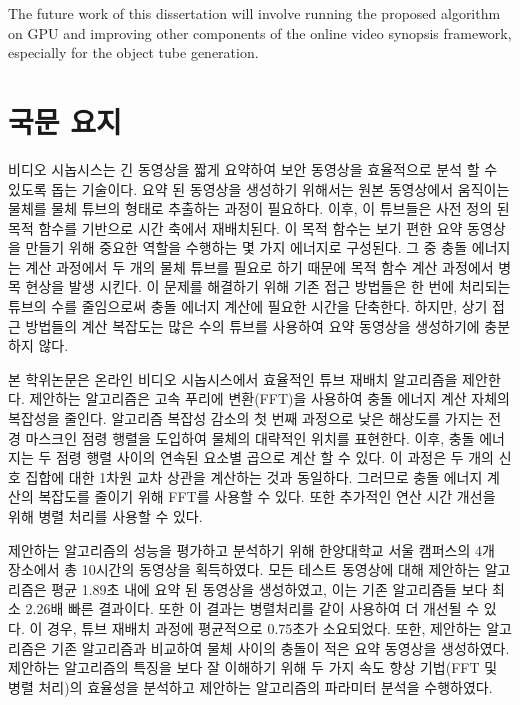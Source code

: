 \documentclass[11pt]{hyu_thesis}
\begin{document}
The future work of this dissertation will involve running the proposed algorithm on GPU and improving other components of the online video synopsis framework, especially for the object tube generation.




\chapter*{국문 요지}

비디오 시놉시스는 긴 동영상을 짧게 요약하여 보안 동영상을 효율적으로 분석 할 수 있도록 돕는 기술이다. 요약 된 동영상을 생성하기 위해서는 원본 동영상에서 움직이는 물체를 물체 튜브의 형태로 추출하는 과정이 필요하다. 이후, 이 튜브들은 사전 정의 된 목적 함수를 기반으로 시간 축에서 재배치된다. 이 목적 함수는 보기 편한 요약 동영상을 만들기 위해 중요한 역할을 수행하는 몇 가지 에너지로 구성된다. 그 중 충돌 에너지는 계산 과정에서 두 개의 물체 튜브를 필요로 하기 때문에 목적 함수 계산 과정에서 병목 현상을 발생 시킨다. 이 문제를 해결하기 위해 기존 접근 방법들은 한 번에 처리되는 튜브의 수를 줄임으로써 충돌 에너지 계산에 필요한 시간을 단축한다. 하지만, 상기 접근 방법들의 계산 복잡도는 많은 수의 튜브를 사용하여 요약 동영상을 생성하기에 충분하지 않다.

본 학위논문은 온라인 비디오 시놉시스에서 효율적인 튜브 재배치 알고리즘을 제안한다. 제안하는 알고리즘은 고속 푸리에 변환(FFT)을 사용하여 충돌 에너지 계산 자체의 복잡성을 줄인다. 알고리즘 복잡성 감소의 첫 번째 과정으로 낮은 해상도를 가지는 전경 마스크인 점령 행렬을 도입하여 물체의 대략적인 위치를 표현한다. 이후, 충돌 에너지는 두 점령 행렬 사이의 연속된 요소별 곱으로 계산 할 수 있다. 이 과정은 두 개의 신호 집합에 대한 1차원 교차 상관을 계산하는 것과 동일하다. 그러므로 충돌 에너지 계산의 복잡도를 줄이기 위해 FFT를 사용할 수 있다. 또한 추가적인 연산 시간 개선을 위해 병렬 처리를 사용할 수 있다.

제안하는 알고리즘의 성능을 평가하고 분석하기 위해 한양대학교 서울 캠퍼스의 4개 장소에서 총 10시간의 동영상을 획득하였다. 모든 테스트 동영상에 대해 제안하는 알고리즘은 평균 1.89초 내에 요약 된 동영상을 생성하였고, 이는 기존 알고리즘들 보다 최소 2.26배 빠른 결과이다. 또한 이 결과는 병렬처리를 같이 사용하여 더 개선될 수 있다. 이 경우, 튜브 재배치 과정에 평균적으로 0.75초가 소요되었다. 또한, 제안하는 알고리즘은 기존 알고리즘과 비교하여 물체 사이의 충돌이 적은 요약 동영상을 생성하였다. 제안하는 알고리즘의 특징을 보다 잘 이해하기 위해 두 가지 속도 향상 기법(FFT 및 병렬 처리)의 효율성을 분석하고 제안하는 알고리즘의 파라미터 분석을 수행하였다.
\end{document}
